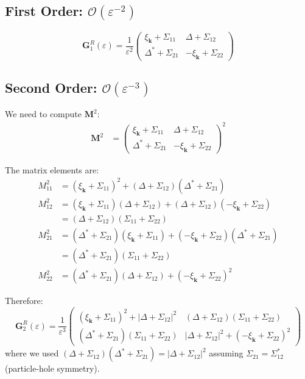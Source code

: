 \documentclass[12pt]{article}
\begin{document}
\subsection{First Order: $\mathcal{O}(\varepsilon^{-2})$}
\begin{equation}
\mathbf{G}^R_1(\varepsilon) = \frac{1}{\varepsilon^2} \begin{pmatrix}
\xi_{\mathbf{k}} + \Sigma_{11} & \Delta + \Sigma_{12} \\
\Delta^* + \Sigma_{21} & -\xi_{\mathbf{k}} + \Sigma_{22}
\end{pmatrix}
\end{equation}

\subsection{Second Order: $\mathcal{O}(\varepsilon^{-3})$}

We need to compute $\mathbf{M}^2$:
\begin{align}
\mathbf{M}^2 &= \begin{pmatrix}
\xi_{\mathbf{k}} + \Sigma_{11} & \Delta + \Sigma_{12} \\
\Delta^* + \Sigma_{21} & -\xi_{\mathbf{k}} + \Sigma_{22}
\end{pmatrix}^2
\end{align}

The matrix elements are:
\begin{align}
M^2_{11} &= (\xi_{\mathbf{k}} + \Sigma_{11})^2 + (\Delta + \Sigma_{12})(\Delta^* + \Sigma_{21}) \\
M^2_{12} &= (\xi_{\mathbf{k}} + \Sigma_{11})(\Delta + \Sigma_{12}) + (\Delta + \Sigma_{12})(-\xi_{\mathbf{k}} + \Sigma_{22}) \\
&= (\Delta + \Sigma_{12})(\Sigma_{11} + \Sigma_{22}) \\
M^2_{21} &= (\Delta^* + \Sigma_{21})(\xi_{\mathbf{k}} + \Sigma_{11}) + (-\xi_{\mathbf{k}} + \Sigma_{22})(\Delta^* + \Sigma_{21}) \\
&= (\Delta^* + \Sigma_{21})(\Sigma_{11} + \Sigma_{22}) \\
M^2_{22} &= (\Delta^* + \Sigma_{21})(\Delta + \Sigma_{12}) + (-\xi_{\mathbf{k}} + \Sigma_{22})^2
\end{align}

Therefore:
\begin{equation}
\mathbf{G}^R_2(\varepsilon) = \frac{1}{\varepsilon^3} \begin{pmatrix}
(\xi_{\mathbf{k}} + \Sigma_{11})^2 + |\Delta + \Sigma_{12}|^2 & (\Delta + \Sigma_{12})(\Sigma_{11} + \Sigma_{22}) \\
(\Delta^* + \Sigma_{21})(\Sigma_{11} + \Sigma_{22}) & |\Delta + \Sigma_{12}|^2 + (-\xi_{\mathbf{k}} + \Sigma_{22})^2
\end{pmatrix}
\end{equation}
where we used $(\Delta + \Sigma_{12})(\Delta^* + \Sigma_{21}) = |\Delta + \Sigma_{12}|^2$ assuming $\Sigma_{21} = \Sigma_{12}^*$ (particle-hole symmetry).
\end{document}
